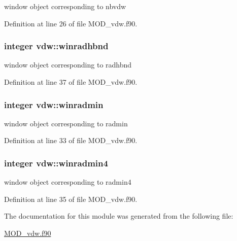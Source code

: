 window object corresponding to nbvdw 



Definition at line 26 of file M\-O\-D\-\_\-vdw.\-f90.

\hypertarget{classvdw_a489e8cba15f756d8ca2a9543e253fab8}{
\subsubsection[{winradhbnd}]{\setlength{\rightskip}{0pt plus 5cm}integer vdw\-::winradhbnd}}\label{classvdw_a489e8cba15f756d8ca2a9543e253fab8}


window object corresponding to radhbnd 



Definition at line 37 of file M\-O\-D\-\_\-vdw.\-f90.

\hypertarget{classvdw_a4dc5326b78b01b48d1ed5a4ae869faa0}{
\subsubsection[{winradmin}]{\setlength{\rightskip}{0pt plus 5cm}integer vdw\-::winradmin}}\label{classvdw_a4dc5326b78b01b48d1ed5a4ae869faa0}


window object corresponding to radmin 



Definition at line 33 of file M\-O\-D\-\_\-vdw.\-f90.

\hypertarget{classvdw_a5d28e96374dca3938469367477be14ab}{
\subsubsection[{winradmin4}]{\setlength{\rightskip}{0pt plus 5cm}integer vdw\-::winradmin4}}\label{classvdw_a5d28e96374dca3938469367477be14ab}


window object corresponding to radmin4 



Definition at line 35 of file M\-O\-D\-\_\-vdw.\-f90.



The documentation for this module was generated from the following file\-:\begin{DoxyCompactItemize}
\item 
\hyperlink{MOD__vdw_8f90}{M\-O\-D\-\_\-vdw.\-f90}\end{DoxyCompactItemize}
